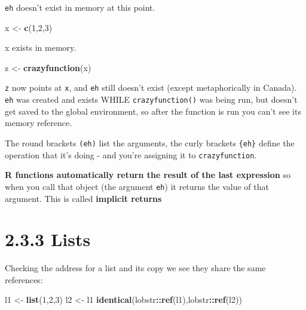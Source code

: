 \documentclass[]{book}
\newenvironment{Shaded}{\begin{snugshade}}{\end{snugshade}}
\newcommand{\DecValTok}[1]{\textcolor[rgb]{0.00,0.00,0.81}{#1}}
\newcommand{\KeywordTok}[1]{\textcolor[rgb]{0.13,0.29,0.53}{\textbf{#1}}}
\newcommand{\NormalTok}[1]{#1}
\newcommand{\OperatorTok}[1]{\textcolor[rgb]{0.81,0.36,0.00}{\textbf{#1}}}
\newcommand{\StringTok}[1]{\textcolor[rgb]{0.31,0.60,0.02}{#1}}
\begin{document}
\texttt{eh} doesn't exist in memory at this point.

\begin{Shaded}
\begin{Highlighting}[]
\NormalTok{x <-}\StringTok{ }\KeywordTok{c}\NormalTok{(}\DecValTok{1}\NormalTok{,}\DecValTok{2}\NormalTok{,}\DecValTok{3}\NormalTok{)}
\end{Highlighting}
\end{Shaded}

x exists in memory.

\begin{Shaded}
\begin{Highlighting}[]
\NormalTok{z <-}\StringTok{ }\KeywordTok{crazyfunction}\NormalTok{(x) }
\end{Highlighting}
\end{Shaded}

\texttt{z} now points at \texttt{x}, and \texttt{eh} still doesn't exist (except metaphorically in Canada). \texttt{eh} was created and exists WHILE \texttt{crazyfunction()} was being run, but doesn't get saved to the global environment, so after the function is run you can't see its memory reference.

The round brackets \texttt{(eh)} list the arguments, the curly brackets \texttt{\{eh\}} define the operation that it's doing - and you're assigning it to \texttt{crazyfunction}.

\textbf{R functions automatically return the result of the last expression} so when you call that object (the argument \texttt{eh}) it returns the value of that argument. This is called \textbf{implicit returns}

\hypertarget{lists}{%
\section*{2.3.3 Lists}\label{lists}}

Checking the address for a list and its copy we see they share the same references:

\begin{Shaded}
\begin{Highlighting}[]
\NormalTok{l1 <-}\StringTok{ }\KeywordTok{list}\NormalTok{(}\DecValTok{1}\NormalTok{,}\DecValTok{2}\NormalTok{,}\DecValTok{3}\NormalTok{)}
\NormalTok{l2 <-}\StringTok{ }\NormalTok{l1}
\KeywordTok{identical}\NormalTok{(lobstr}\OperatorTok{::}\KeywordTok{ref}\NormalTok{(l1),lobstr}\OperatorTok{::}\KeywordTok{ref}\NormalTok{(l2))}
\end{Highlighting}
\end{Shaded}
\end{document}
